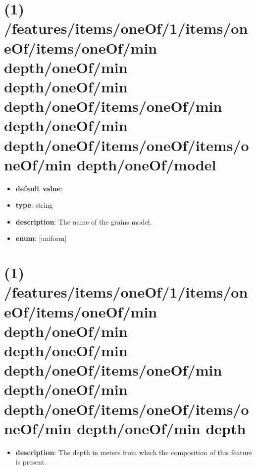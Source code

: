 \section{(1) /features/items/oneOf/1/items/oneOf/items/oneOf/min depth/oneOf/min depth/oneOf/min depth/oneOf/items/oneOf/min depth/oneOf/min depth/oneOf/items/oneOf/items/oneOf/min depth/oneOf/model}
\begin{itemize}[leftmargin=1em]\item {\bf default value}: 
\item {\bf type}: string
\item {\bf description}: The name of the grains model.
\item {\bf enum}: [uniform]\end{itemize}\section{(1) /features/items/oneOf/1/items/oneOf/items/oneOf/min depth/oneOf/min depth/oneOf/min depth/oneOf/items/oneOf/min depth/oneOf/min depth/oneOf/items/oneOf/items/oneOf/min depth/oneOf/min depth}
\begin{itemize}[leftmargin=1em]\item {\bf description}: The depth in meters from which the composition of this feature is present.
\end{itemize}
